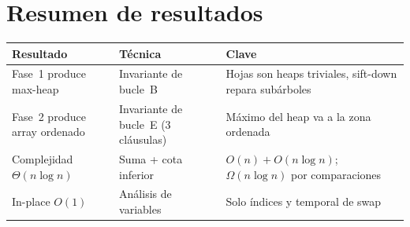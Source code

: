 \documentclass[11pt, letterpaper]{article}
\theoremstyle{definition}
\theoremstyle{plain}
\theoremstyle{remark}
\begin{document}
\section{Resumen de resultados}

\begin{table}[h]
\centering
\begin{tabular}{llp{5.5cm}}
\toprule
\textbf{Resultado} & \textbf{Técnica} & \textbf{Clave} \\
\midrule
Fase~1 produce max-heap
  & Invariante de bucle~B
  & Hojas son heaps triviales, sift-down repara subárboles \\
Fase~2 produce array ordenado
  & Invariante de bucle~E (3 cláusulas)
  & Máximo del heap va a la zona ordenada \\
Complejidad $\Theta(n \log n)$
  & Suma + cota inferior
  & $O(n) + O(n\log n)$; $\Omega(n\log n)$ por comparaciones \\
In-place $O(1)$
  & Análisis de variables
  & Solo índices y temporal de swap \\
\bottomrule
\end{tabular}
\end{table}
\end{document}

